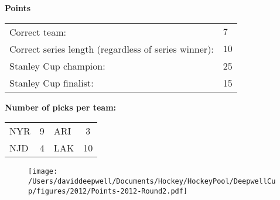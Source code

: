 \documentclass[10pt]{article}
\begin{document}
{\bf Points}\\
\begin{minipage}{12cm}
    \begin{tabular}{l l}
        Correct team:	& $7$\\
        Correct series length (regardless of series winner):	& $10$\\
        Stanley Cup champion:	& 25\\
        Stanley Cup finalist:	& 15\\
    \end{tabular}

    \vspace{1cm}
    {\bf Number of picks per team:}\\
    \begin{tabular}{lc | lc }
        NYR & 9 & ARI & 3 \\
        NJD & 4 & LAK & 10 \\
    \end{tabular}
\end{minipage}
\begin{minipage}[t]{13cm}
    \begin{figure}[H]
        \vspace{-2.5cm}
        \texttt{[image: /Users/daviddeepwell/Documents/Hockey/HockeyPool/DeepwellCup/figures/2012/Points-2012-Round2.pdf]}
    \end{figure}
\end{minipage}
\end{document}
